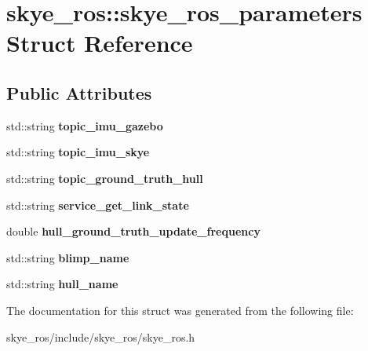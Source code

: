 \hypertarget{structskye__ros_1_1skye__ros__parameters}{\section{skye\-\_\-ros\-:\-:skye\-\_\-ros\-\_\-parameters Struct Reference}
\label{structskye__ros_1_1skye__ros__parameters}
}
\subsection*{Public Attributes}
\begin{DoxyCompactItemize}
\item 
\hypertarget{structskye__ros_1_1skye__ros__parameters_abc91bf8157ed23bf70513961c8f21ef8}{std\-::string {\bfseries topic\-\_\-imu\-\_\-gazebo}}\label{structskye__ros_1_1skye__ros__parameters_abc91bf8157ed23bf70513961c8f21ef8}

\item 
\hypertarget{structskye__ros_1_1skye__ros__parameters_ad9a6f627926b8ba9c8895b5f9857cce9}{std\-::string {\bfseries topic\-\_\-imu\-\_\-skye}}\label{structskye__ros_1_1skye__ros__parameters_ad9a6f627926b8ba9c8895b5f9857cce9}

\item 
\hypertarget{structskye__ros_1_1skye__ros__parameters_aa867963d220c8d3bdce8871487d20ffb}{std\-::string {\bfseries topic\-\_\-ground\-\_\-truth\-\_\-hull}}\label{structskye__ros_1_1skye__ros__parameters_aa867963d220c8d3bdce8871487d20ffb}

\item 
\hypertarget{structskye__ros_1_1skye__ros__parameters_a0512980e99daf77a15c9fb62744cb819}{std\-::string {\bfseries service\-\_\-get\-\_\-link\-\_\-state}}\label{structskye__ros_1_1skye__ros__parameters_a0512980e99daf77a15c9fb62744cb819}

\item 
\hypertarget{structskye__ros_1_1skye__ros__parameters_a9474c6e4c132b4a9f3c0287ccb8df1d0}{double {\bfseries hull\-\_\-ground\-\_\-truth\-\_\-update\-\_\-frequency}}\label{structskye__ros_1_1skye__ros__parameters_a9474c6e4c132b4a9f3c0287ccb8df1d0}

\item 
\hypertarget{structskye__ros_1_1skye__ros__parameters_adfece757e4b6692b2622be816c5e2450}{std\-::string {\bfseries blimp\-\_\-name}}\label{structskye__ros_1_1skye__ros__parameters_adfece757e4b6692b2622be816c5e2450}

\item 
\hypertarget{structskye__ros_1_1skye__ros__parameters_aa13dc5a1696b1ca9f5b14437a6282f1a}{std\-::string {\bfseries hull\-\_\-name}}\label{structskye__ros_1_1skye__ros__parameters_aa13dc5a1696b1ca9f5b14437a6282f1a}

\end{DoxyCompactItemize}


The documentation for this struct was generated from the following file\-:\begin{DoxyCompactItemize}
\item 
skye\-\_\-ros/include/skye\-\_\-ros/skye\-\_\-ros.\-h\end{DoxyCompactItemize}
